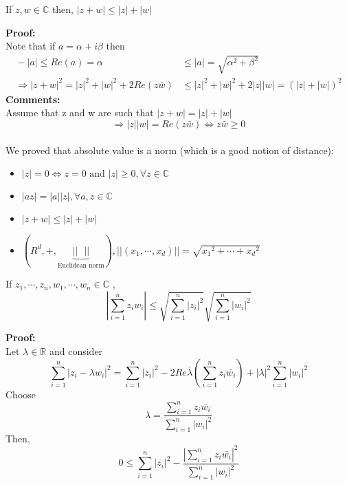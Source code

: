 \begin{lemma}{}
If $ z,w\in \mathbb{C} $ then, $ |z+w|\leq |z|+|w| $  
\end{lemma}
\textbf{Proof:}
\\Note that if $ a=\alpha+i\beta $ then 
\begin{align*}{}{}
-|a|\leq Re(a)=\alpha&\leq |a|=\sqrt{\alpha^2+\beta^2}\\
\Rightarrow {|z+w|}^2=|z|^2+|w|^2+2Re(z\bar{w})&\leq |z|^2+|w|^2+2|z||w|={(|z|+|w|)}^2
\end{align*}
\textbf{Comments:}
\\Assume that z and w are such that $ |z+w|=|z|+|w| $
$$
    \Rightarrow |z||w|=Re(z\bar{w}) \Leftrightarrow z\bar{w}\geq 0
$$ 
\\We proved that absolute value is a norm (which is a good notion of distance):
\begin{itemize}
\item $|z|=0 \Leftrightarrow z=0 \text{ and } |z|\geq0, \forall z\in\mathbb{C}$
\item $ |az|=|a||z|,\forall a, z \in \mathbb{C} $
\item $ |z+w|\leq |z|+|w| $
\item  $(R^d,+,\underbrace{|| \text{ }||}_{\text{Euclidean norm}}) , ||(x_1,\cdots,x_d)||=\sqrt{{x_1}^2+\cdots+{x_d}^2} $
\end{itemize}
\begin{lemma}{}
If $ z_1,\cdots,z_n,w_1,\cdots,w_n\in\mathbb{C} $ ,
$$
    |\sum_{i=1}^{n}z_iw_i|\leq \sqrt{\sum_{i=1}^{n}{|z_i|}^2}\sqrt{\sum_{i=1}^{n}{|w_i|}^2}
$$ 
\end{lemma}
\textbf{Proof:}
\\Let $ \lambda\in\mathbb{R}  $ and consider
$$
    \sum_{i=1}^{n}{|z_i-\lambda w_i|}^2=\sum_{i=1}^{n}{|z_i|}^2-2 Re\bar{\lambda}(\sum_{i=1}^{n}z_i\bar{w_i})+|\lambda|^2\sum_{i=1}^{n}{|w_i|}^2
$$ 
Choose
$$
    \lambda= \frac{\sum_{i=1}^{n}z_i\bar{w_i}}{\sum_{i=1}^{n}{|w_i|}^2}
$$ 
Then,
$$
    0\leq \sum_{i=1}^{n}{|z_i|}^2-\frac{{|\sum_{i=1}^{n}z_i\bar{w_i}|}^2}{\sum_{i=1}^{n}{|w_i|}^2}
$$ 
